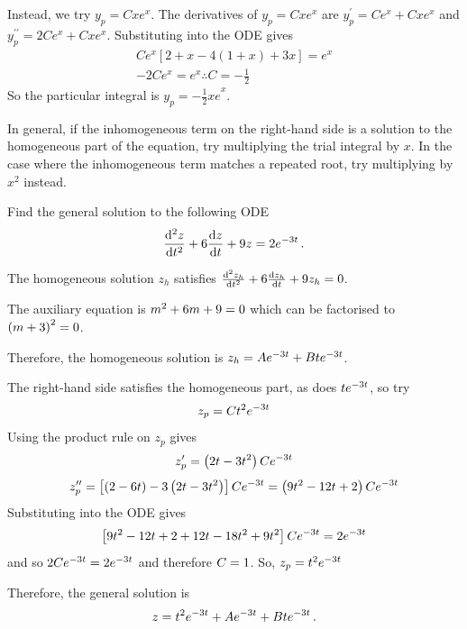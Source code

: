 Instead, we try ${y}_{p}=Cx{e}^{x}$. The derivatives of ${y}_{p}=Cx{e}^{x}$ are ${y}_{p}^{\prime }=C{e}^{x}+Cx{e}^{x}$ and ${y}_{p}^{\prime \prime }=2C{e}^{x}+Cx{e}^{x}$. Substituting into the ODE gives
\[
\begin{gathered}
C{e}^{x}\left[2+x-4(1+x)+3x\right]={e}^{x}
\\[4pt]
-2C{e}^{x}={e}^{x} \therefore C=-\frac{1}{2}
\end{gathered}
\]
So the particular integral is ${y}_{p}={-\frac{1}{2}xe}^{x}$. 

In general, if the inhomogeneous term on the right-hand side is a solution to the homogeneous part of the equation, try multiplying the trial integral by $x$. In the case where the inhomogeneous term matches a repeated root, try multiplying by ${x}^{2}$ instead.

\goodbreak
\begin{example}[Lecture]
\label{ex:666}

Find the general solution to the following ODE
\[
\frac{{\rm d} ^2z}{{\rm d} t^2}+6\frac{{\rm d} z}{{\rm d} t}+9z=2{e}^{-3t} \, .
\]
\end{example}
\begin{solution}

The homogeneous solution ${z}_{h}$ satisfies $\frac{{\rm d} ^{2}{z}_{h}}{{\rm d} {t}^{2}}+6\frac{{\rm d} {z}_{h}}{{\rm d} t}+9{z}_{h}=0$.

The auxiliary equation is ${m}^{2}+6m+9=0$ which can be factorised to ${\left(m+3\right)}^{2}=0$.

Therefore, the homogeneous solution is ${z}_{h}=A{e}^{-3t}+Bt{e}^{-3t}$.

The right-hand side satisfies the homogeneous part, as does $t{e}^{-3t}$, so try
\[
{z}_{p}=C{t}^{2}{e}^{-3t}
\]
Using the product rule on $z_p$ gives
\[
\begin{gathered}
{z}_{p}^{\prime }=\left(2t-3{t}^{2}\right)C{e}^{-3t}
\\[4pt]
{z}_{p}^{\prime \prime }=\left[\left(2-6t\right)-3\left(2t-3{t}^{2}\right)\right]C{e}^{-3t}=\left(9{t}^{2}-12t+2\right)C{e}^{-3t}
\end{gathered}
\]
Substituting into the ODE gives
\[
\left[9{t}^{2}-12t+2+12t-18{t}^{2}+9{t}^{2}\right]C{e}^{-3t}=2{e}^{-3t}
\]
and so $2C{e}^{-3t}=2{e}^{-3t}$ and therefore $ C=1$. So, ${z}_{p}={t}^{2}{e}^{-3t}$

Therefore, the general solution is
\[
z={t}^{2}{e}^{-3t}+A{e}^{-3t}+Bt{e}^{-3t} \, .
\]
\end{solution}

